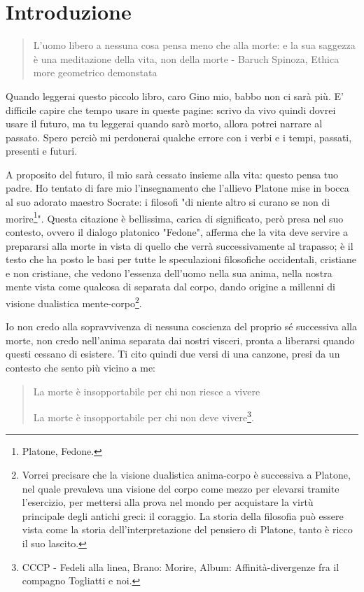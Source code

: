 \chapter*{Introduzione}

\begin{quotation}
	\small L'uomo libero a nessuna cosa pensa meno che alla morte: e la sua saggezza è una meditazione della vita, non della morte - Baruch Spinoza, Ethica more geometrico demonstata
\end{quotation}

Quando leggerai questo piccolo libro, caro Gino mio, babbo non ci sarà più. E' difficile capire che tempo usare in queste pagine: scrivo da vivo quindi dovrei usare il futuro, ma tu leggerai quando sarò morto, allora potrei narrare al passato. Spero perciò mi perdonerai qualche errore con i verbi e i tempi, passati, presenti e futuri.

A proposito del futuro, il mio sarà cessato insieme alla vita: questo pensa tuo padre. Ho tentato di fare mio l'insegnamento che l'allievo Platone mise in bocca al suo adorato maestro Socrate: i filosofi "di niente altro si curano se non di morire\footnote{Platone, Fedone.}". Questa citazione è bellissima, carica di significato, però presa nel suo contesto, ovvero il dialogo platonico "Fedone", afferma che la vita deve servire a prepararsi alla morte in vista di quello che verrà successivamente al trapasso; è il testo che ha posto le basi per tutte le speculazioni filosofiche occidentali, cristiane e non cristiane, che vedono l'essenza dell'uomo nella sua anima, nella nostra mente vista come qualcosa di separata dal corpo, dando origine a millenni di visione dualistica mente-corpo\footnote{Vorrei precisare che la visione dualistica anima-corpo è successiva a Platone, nel quale prevaleva una visione del corpo come mezzo per elevarsi tramite l'esercizio, per mettersi alla prova nel mondo per acquistare la virtù principale degli antichi greci: il coraggio. La storia della filosofia può essere vista come la storia dell'interpretazione del pensiero di Platone, tanto è ricco il suo lascito.}. 

Io non credo alla sopravvivenza di nessuna coscienza del proprio sé successiva alla morte, non credo nell'anima separata dai nostri visceri, pronta a liberarsi quando questi cessano di esistere. Ti cito quindi due versi di una canzone, presi da un contesto che sento più vicino a me:

\begin{quotation}
	\small La morte è insopportabile per chi non riesce a vivere
	
	La morte è insopportabile per chi non deve vivere\footnote{CCCP - Fedeli alla linea, Brano: Morire, Album: Affinità-divergenze fra il compagno Togliatti e noi. }.
\end{quotation}

